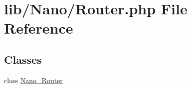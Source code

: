 \hypertarget{Router_8php}{
\section{lib/Nano/Router.php File Reference}
\label{Router_8php}
}
\subsection*{Classes}
\begin{CompactItemize}
\item 
class \hyperlink{classNano__Router}{Nano\_\-Router}
\end{CompactItemize}
